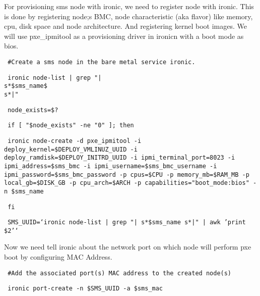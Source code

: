 \documentclass[12pt]{article}
\begin{document}
For provisioning sms node with ironic, we need to register node with ironic. This is done by registering node;s BMC, node characteristic (aka flavor) like memory, cpu, disk space and node architecture. And registering kernel boot images. We will use pxe\_ipmitool as a provisioning driver in ironicn with a boot mode as bios.

\begin{bash}\texttt{\small{ \#Create a sms node in the bare metal service ironic.}}\end{bash}
\begin{bash}\texttt{\small{     ironic node-list | grep "|\\s*\${sms\_name}\$\\s*|"}}\end{bash}
\begin{bash}\texttt{\small{     node\_exists=\$?}}\end{bash}
\begin{bash}\texttt{\small{     if [ "\${node\_exists}" -ne "0" ]; then}}\end{bash}
\begin{bash}\texttt{\small{         ironic node-create -d pxe\_ipmitool -i deploy\_kernel=\${DEPLOY\_VMLINUZ\_UUID} -i deploy\_ramdisk=\${DEPLOY\_INITRD\_UUID} -i ipmi\_terminal\_port=8023 -i ipmi\_address=\${sms\_bmc} -i ipmi\_username=\${sms\_bmc\_username} -i ipmi\_password=\${sms\_bmc\_password} -p cpus=\${CPU} -p memory\_mb=\${RAM\_MB} -p local\_gb=\${DISK\_GB} -p cpu\_arch=\${ARCH} -p capabilities="boot\_mode:bios" -n \${sms\_name}}}\end{bash}
\begin{bash}\texttt{\small{     fi}}\end{bash}
\begin{bash}\texttt{\small{     SMS\_UUID=`ironic node-list | grep "|\\s*\${sms\_name}\\s*|" | awk '{print \$2}'`}}\end{bash}

Now we need tell ironic about the network port on which node will perform pxe boot by configuring MAC Address. 

\begin{bash}\texttt{\small{     \#Add the associated port(s) MAC address to the created node(s)}}\end{bash}
\begin{bash}\texttt{\small{     ironic port-create -n \${SMS\_UUID} -a \${sms\_mac}}}\end{bash}
\end{document}
